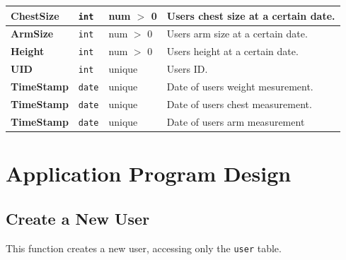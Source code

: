 \documentclass{article}
\begin{document}
\begin{adjustwidth}{-2.25cm}{}
\begin{center}
\begin{tabular}{l|lll}
        \textbf{ChestSize}        & \texttt{int}       & num $>$ 0             & Users chest size at a certain date.  \\ \midrule
        \textbf{ArmSize}          & \texttt{int}       & num $>$ 0             & Users arm size at a certain date.  \\
        \textbf{Height}           & \texttt{int}       & num $>$ 0             & Users height at a certain date.  \\
        \textbf{UID}              & \texttt{int}       & unique                & Users ID.  \\
        \textbf{TimeStamp}        & \texttt{date}      & unique                & Date of users weight mesurement.  \\ \midrule
        \textbf{TimeStamp}        & \texttt{date}      & unique                & Date of users chest measurement.  \\
        \textbf{TimeStamp}        & \texttt{date}      & unique                & Date of users arm measurement \\
        \bottomrule
    \end{tabular}
\end{center}
\end{adjustwidth}

\section{Application Program Design}

\subsection*{Create a New User}
This function creates a new user, accessing only the \texttt{user} table. \\
\end{document}

